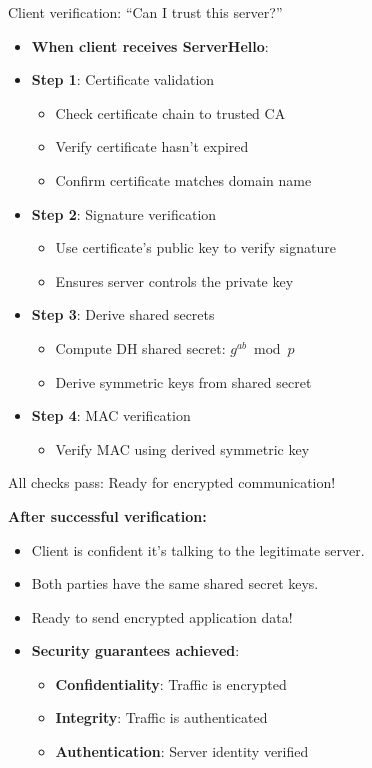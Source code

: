 \documentclass[aspectratio=169, lualatex, handout]{beamer}
\begin{document}
\begin{frame}{Client verification: ``Can I trust this server?''}
	\begin{itemize}
		\item \textbf{When client receives ServerHello}:
		\item \textbf{Step 1}: Certificate validation
		      \begin{itemize}
			      \item Check certificate chain to trusted CA
			      \item Verify certificate hasn't expired
			      \item Confirm certificate matches domain name
		      \end{itemize}
		\item \textbf{Step 2}: Signature verification
		      \begin{itemize}
			      \item Use certificate's public key to verify signature
			      \item Ensures server controls the private key
		      \end{itemize}
		\item \textbf{Step 3}: Derive shared secrets
		      \begin{itemize}
			      \item Compute DH shared secret: $g^{ab} \bmod p$
			      \item Derive symmetric keys from shared secret
		      \end{itemize}
		\item \textbf{Step 4}: MAC verification
		      \begin{itemize}
			      \item Verify MAC using derived symmetric key
		      \end{itemize}
	\end{itemize}
\end{frame}

\begin{frame}{All checks pass: Ready for encrypted communication!}
	\begin{center}
		\textbf{After successful verification:}
	\end{center}
	\begin{itemize}
		\item Client is confident it's talking to the legitimate server.
		\item Both parties have the same shared secret keys.
		\item Ready to send encrypted application data!
		\item \textbf{Security guarantees achieved}:
		      \begin{itemize}
			      \item \textbf{Confidentiality}: Traffic is encrypted
			      \item \textbf{Integrity}: Traffic is authenticated
			      \item \textbf{Authentication}: Server identity verified
		      \end{itemize}
	\end{itemize}
\end{frame}
\end{document}
